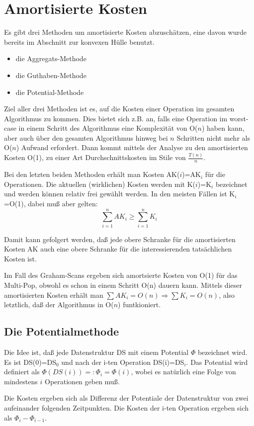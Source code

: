 \section{Amortisierte Kosten}
Es gibt drei Methoden um amortisierte Kosten abzuschätzen, eine davon wurde bereits im Abschnitt zur konvexen Hülle
benutzt. 
\begin{itemize}
\item die Aggregats-Methode
\item die Guthaben-Methode
\item die Potential-Methode
\end{itemize} 
Ziel aller drei Methoden ist es, auf die Kosten einer Operation im gesamten Algorithmus zu kommen. Dies bietet sich z.B.
an, falls eine Operation im worst-case in einem Schritt des Algorithmus eine Komplexität von O($n$) haben kann,
aber auch über den gesamten Algorithmus hinweg bei $n$ Schritten nicht mehr als O($n$) Aufwand erfordert. Dann kommt
mittels der Analyse zu den amortisierten Kosten O(1), zu einer Art Durchschnittskosten im Stile von $\frac{T(n)}{n}$.

Bei den letzten beiden Methoden erhält man Kosten AK($i$)=AK$_i$ für die Operationen.
Die aktuellen (wirklichen) Kosten werden
mit K($i$)=K$_i$ bezeichnet und werden können relativ frei gewählt werden. In den meisten Fällen ist K$_i$=O(1),
dabei muß aber gelten:
\[\sum_{i=1}^n AK_i \geq \sum_{i=1}^n K_i\]

Damit kann gefolgert werden, daß jede obere Schranke für die amortisierten Kosten AK auch eine obere Schranke
für die interessierenden tatsächlichen Kosten ist.

Im Fall des Graham-Scans ergeben sich amortsierte Kosten von O(1) für das Multi-Pop, obwohl es schon in einem Schritt
O(n) dauern kann. Mittels dieser amortisierten Kosten erhält man $\sum AK_i=O(n) \Rightarrow \sum K_i=O(n)$, also
letztlich, daß der Algorithmus in O($n$) funtkioniert.

\subsection{Die Potentialmethode}
Die Idee ist, daß jede Datenstruktur DS mit einem Potential $\Phi$ bezeichnet wird. Es ist DS(0)=DS$_0$ und nach der i-ten
Operation DS(i)=DS$_i$. Das Potential wird definiert als $\Phi(DS(i))=:{\Phi}_i=\Phi(i)$, wobei es natürlich
eine Folge von mindestens $i$ Operationen geben muß.

Die Kosten ergeben sich als Differenz der Potentiale der Datenstruktur von zwei aufeinander folgenden Zeitpunkten. Die
Kosten der i-ten Operation ergeben sich als ${\Phi}_i-{\Phi}_{i-1}$.

